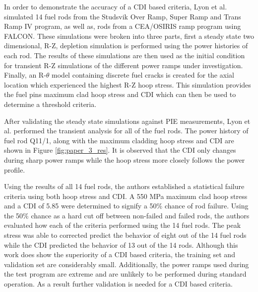 \documentclass[edeposit,fullpage,12pt]{uiucthesis2009}
\begin{document}
In order to demonstrate the accuracy of a \gls{CDI} based criteria, Lyon et al. simulated 14 fuel rods from the Studsvik Over Ramp, Super Ramp and Trans Ramp IV program, as well as, rods from a CEA/OSIRIS ramp program using FALCON.
These simulations were broken into three parts, first a steady state two dimensional, R-Z, depletion simulation is performed using the power histories of each rod.
The results of these simulations are then used as the initial condition for transient R-Z simulations of the different power ramps under investigation.
Finally, an R-$\theta$ model containing discrete fuel cracks is created for the axial location which experienced the highest R-Z hoop stress.
This simulation provides the fuel pins maximum clad hoop stress and \gls{CDI} which can then be used to determine a threshold criteria.

After validating the steady state simulations against \gls{PIE} measurements, Lyon et al. performed the transient analysis for all of the fuel rods. 
The power history of fuel rod Q11/1, along with the maximum cladding hoop stress and \gls{CDI} are shown in Figure \ref{fig:paper_3_res}.
It is observed that the \gls{CDI} only changes during sharp power ramps while the hoop stress more closely follows the power profile.

Using the results of all 14 fuel rods, the authors established a statistical failure criteria using both hoop stress and \gls{CDI}.
A 550 MPa maximum clad hoop stress  and a \gls{CDI} of 5.85 were determined to signify a 50\% chance of rod failure.
Using the 50\% chance as a hard cut off between non-failed and failed rods, the authors evaluated how each of the criteria performed using the 14 fuel rods.
The peak stress was able to corrected predict the behavior of eight out of the 14 fuel rods while the \gls{CDI} predicted the behavior of 13 out of the 14 rods.
Although this work does show the superiority of a \gls{CDI} based criteria, the training set and validation set are considerably small.
Additionally, the power ramps used during the test program are extreme and are unlikely to be performed during standard operation.
As a result further validation is needed for a \gls{CDI} based criteria.
 
\end{document}
